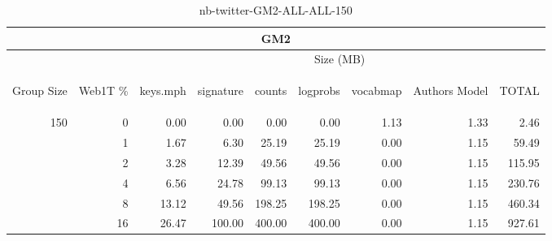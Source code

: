 \begin{center}
\begin{table}[htbp] 
 \begin{center}
\begin{tabular}{ | r | r | r | r | r | r | r | r | r |}
\hline
\multicolumn{9}{|c|}{GM2}\\
\hline
 & & \multicolumn{7}{|c|}{Size (MB)}\\ \cline{3-9}
\begin{sideways}Group Size\end{sideways} & \begin{sideways}Web1T \% \end{sideways} & \begin{sideways}keys.mph\end{sideways} & \begin{sideways}signature\end{sideways} & \begin{sideways}counts\end{sideways} & \begin{sideways}logprobs\end{sideways} & \begin{sideways}vocabmap\end{sideways} & \begin{sideways}Authors Model \end{sideways} & \begin{sideways}TOTAL\end{sideways}\\
\hline
\multirow{5}{*}{150}
 & 0 & 0.00 & 0.00 & 0.00 & 0.00 & 1.13 & 1.33 & 2.46\\ \cline{2-9}
 & 1 & 1.67 & 6.30 & 25.19 & 25.19 & 0.00 & 1.15 & 59.49\\ \cline{2-9}
 & 2 & 3.28 & 12.39 & 49.56 & 49.56 & 0.00 & 1.15 & 115.95\\ \cline{2-9}
 & 4 & 6.56 & 24.78 & 99.13 & 99.13 & 0.00 & 1.15 & 230.76\\ \cline{2-9}
 & 8 & 13.12 & 49.56 & 198.25 & 198.25 & 0.00 & 1.15 & 460.34\\ \cline{2-9}
 & 16 & 26.47 & 100.00 & 400.00 & 400.00 & 0.00 & 1.15 & 927.61\\ \cline{2-9}
\hline
\end{tabular}
\caption{nb-twitter-GM2-ALL-ALL-150}
\label{table:nb-twitter-GM2-ALL-ALL-150}
\end{center}
 \end{table}
\end{center}

